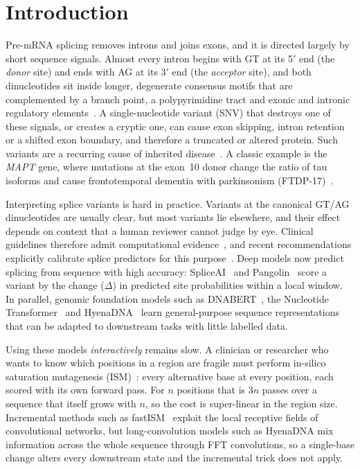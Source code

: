 \documentclass[conference]{IEEEtran}
\begin{document}
\section{Introduction}
Pre-mRNA splicing removes introns and joins exons, and it is directed largely by short sequence signals. Almost every intron begins with GT at its 5$'$ end (the \emph{donor} site) and ends with AG at its 3$'$ end (the \emph{acceptor} site), and both dinucleotides sit inside longer, degenerate consensus motifs that are complemented by a branch point, a polypyrimidine tract and exonic and intronic regulatory elements~\cite{lee2015splicing,wang2008splicingcode}. A single-nucleotide variant (SNV) that destroys one of these signals, or creates a cryptic one, can cause exon skipping, intron retention or a shifted exon boundary, and therefore a truncated or altered protein. Such variants are a recurring cause of inherited disease~\cite{scotti2016missplicing,xiong2015splicingcode}. A classic example is the \textit{MAPT} gene, where mutations at the exon~10 donor change the ratio of tau isoforms and cause frontotemporal dementia with parkinsonism (FTDP-17)~\cite{hutton1998ftdp17}.

Interpreting splice variants is hard in practice. Variants at the canonical GT/AG dinucleotides are usually clear, but most variants lie elsewhere, and their effect depends on context that a human reviewer cannot judge by eye. Clinical guidelines therefore admit computational evidence~\cite{richards2015acmg}, and recent recommendations explicitly calibrate splice predictors for this purpose~\cite{walker2023clingen}. Deep models now predict splicing from sequence with high accuracy: SpliceAI~\cite{jaganathan2019spliceai} and Pangolin~\cite{zeng2022pangolin} score a variant by the change ($\Delta$) in predicted site probabilities within a local window. In parallel, genomic foundation models such as DNABERT~\cite{ji2021dnabert,zhou2024dnabert2}, the Nucleotide Transformer~\cite{dallatorre2025nt} and HyenaDNA~\cite{nguyen2023hyenadna} learn general-purpose sequence representations that can be adapted to downstream tasks with little labelled data.

Using these models \emph{interactively} remains slow. A clinician or researcher who wants to know which positions in a region are fragile must perform in-silico saturation mutagenesis (ISM)~\cite{alipanahi2015deepbind}: every alternative base at every position, each scored with its own forward pass. For $n$ positions that is $3n$ passes over a sequence that itself grows with $n$, so the cost is super-linear in the region size. Incremental methods such as fastISM~\cite{nair2022fastism} exploit the local receptive fields of convolutional networks, but long-convolution models such as HyenaDNA mix information across the whole sequence through FFT convolutions, so a single-base change alters every downstream state and the incremental trick does not apply.
\end{document}
